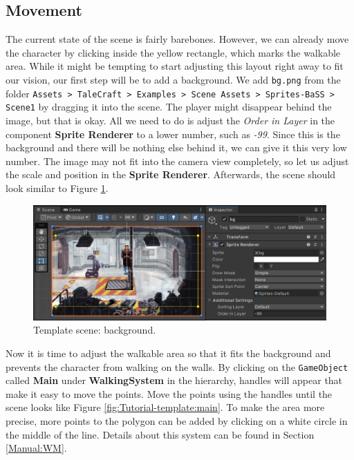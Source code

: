 \subsection{Movement}
The current state of the scene is fairly barebones. However, we can already move the character by clicking inside the yellow rectangle, which marks the walkable area. While it might be tempting to start adjusting this layout right away to fit our vision, our first step will be to add a background.  We add \verb|bg.png|  from the folder \texttt{Assets > TaleCraft > Examples > Scene Assets > Sprites-BaSS > Scene1} by dragging it into the scene. The player might disappear behind the image, but that is okay. All we need to do is adjust the \textit{Order in Layer} in the component \textbf{Sprite Renderer} to a lower number, such as \textit{-99}. Since this is the background and there will be nothing else behind it, we can give it this very low number. The image may not fit into the camera view completely, so let us adjust the scale and position in the \textbf{Sprite Renderer}. Afterwards, the scene should look similar to Figure \ref{fig:Tutorial-template:bg}.
\begin{figure}[H]
\centering
\includegraphics[width=1\linewidth]{img/User doc/image_2025-07-08_104224540.png}
\caption{Template scene: background.}
\label{fig:Tutorial-template:bg}
\end{figure}

Now it is time to adjust the walkable area so that it fits the background and prevents the character from walking on the walls. By clicking on the \verb|GameObject| called \textbf{Main} under \textbf{WalkingSystem} in the hierarchy, handles will appear that make it easy to move the points. Move the points using the handles until the scene looks like Figure \ref{fig:Tutorial-template:main}. To make the area more precise, more points to the polygon can be added by clicking on a white circle in the middle of the line. Details about this system can be found in Section \ref{Manual:WM}.

